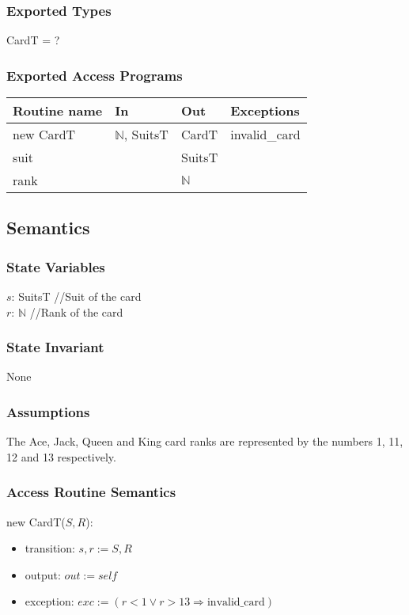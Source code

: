 \documentclass[12pt,fleqn]{article}
\begin{document}
\subsubsection* {Exported Types}

CardT = ?

\subsubsection* {Exported Access Programs}

\begin{tabular}{| l | l | l | l |}
\hline
\textbf{Routine name} & \textbf{In} & \textbf{Out} & \textbf{Exceptions}\\
\hline
new CardT & $\mathbb{N}$, SuitsT & CardT & invalid\_card\\
\hline
suit & ~ & SuitsT & ~\\
\hline
rank & ~ & $\mathbb{N}$ & ~\\
\hline 

\end{tabular}

\subsection* {Semantics}

\subsubsection* {State Variables}

$s$: SuitsT //Suit of the card \\
$r$: $\mathbb{N}$ //Rank of the card

\subsubsection* {State Invariant}
None

\subsubsection* {Assumptions}
The Ace, Jack, Queen and King card ranks are represented by the numbers 1, 11, 12 and 13 respectively.

\subsubsection* {Access Routine Semantics}

\noindent new CardT($\mathit{S}, \mathit{R}$):
\begin{itemize}
\item transition: $s, r :=\mathit{S}, \mathit{R}$
\item output: $out := \mathit{self}$
\item exception: $exc := (r < 1 \lor r > 13 \Rightarrow \mbox{invalid\_card})$
\end{itemize}
\end{document}
